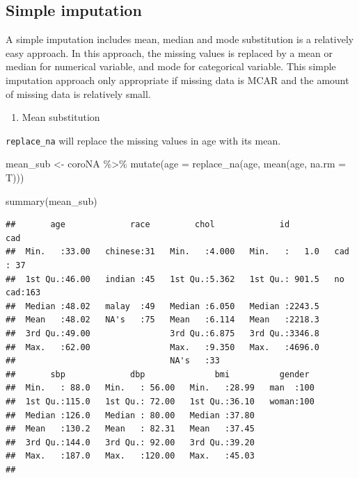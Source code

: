 \documentclass[
  10pt,
]{krantz}
\newenvironment{Shaded}{\begin{snugshade}}{\end{snugshade}}
\newcommand{\AttributeTok}[1]{\textcolor[rgb]{0.77,0.63,0.00}{#1}}
\newcommand{\FunctionTok}[1]{\textcolor[rgb]{0.00,0.00,0.00}{#1}}
\newcommand{\NormalTok}[1]{#1}
\newcommand{\OtherTok}[1]{\textcolor[rgb]{0.56,0.35,0.01}{#1}}
\newcommand{\SpecialCharTok}[1]{\textcolor[rgb]{0.00,0.00,0.00}{#1}}
\providecommand{\tightlist}{%
  \setlength{\itemsep}{0pt}\setlength{\parskip}{0pt}}
\begin{document}
\hypertarget{simple-imputation}{%
\subsection{\texorpdfstring{Simple imputation}{Simple imputation}}\label{simple-imputation}}

A simple imputation includes mean, median and mode substitution is a relatively easy approach. In this approach, the missing values is replaced by a mean or median for numerical variable, and mode for categorical variable. This simple imputation approach only appropriate if missing data is MCAR and the amount of missing data is relatively small.

\begin{enumerate}
\def\labelenumi{\arabic{enumi}.}
\tightlist
\item
  Mean substitution
\end{enumerate}

\texttt{replace\_na} will replace the missing values in age with its mean.

\begin{Shaded}
\begin{Highlighting}[]
\NormalTok{mean\_sub }\OtherTok{\textless{}{-}} 
\NormalTok{  coroNA }\SpecialCharTok{\%\textgreater{}\%} 
  \FunctionTok{mutate}\NormalTok{(}\AttributeTok{age =} \FunctionTok{replace\_na}\NormalTok{(age, }\FunctionTok{mean}\NormalTok{(age, }\AttributeTok{na.rm =}\NormalTok{ T)))}

\FunctionTok{summary}\NormalTok{(mean\_sub)}
\end{Highlighting}
\end{Shaded}

\begin{verbatim}
##       age             race         chol             id             cad     
##  Min.   :33.00   chinese:31   Min.   :4.000   Min.   :   1.0   cad   : 37  
##  1st Qu.:46.00   indian :45   1st Qu.:5.362   1st Qu.: 901.5   no cad:163  
##  Median :48.02   malay  :49   Median :6.050   Median :2243.5               
##  Mean   :48.02   NA's   :75   Mean   :6.114   Mean   :2218.3               
##  3rd Qu.:49.00                3rd Qu.:6.875   3rd Qu.:3346.8               
##  Max.   :62.00                Max.   :9.350   Max.   :4696.0               
##                               NA's   :33                                   
##       sbp             dbp              bmi          gender   
##  Min.   : 88.0   Min.   : 56.00   Min.   :28.99   man  :100  
##  1st Qu.:115.0   1st Qu.: 72.00   1st Qu.:36.10   woman:100  
##  Median :126.0   Median : 80.00   Median :37.80              
##  Mean   :130.2   Mean   : 82.31   Mean   :37.45              
##  3rd Qu.:144.0   3rd Qu.: 92.00   3rd Qu.:39.20              
##  Max.   :187.0   Max.   :120.00   Max.   :45.03              
## 
\end{verbatim}
\end{document}
